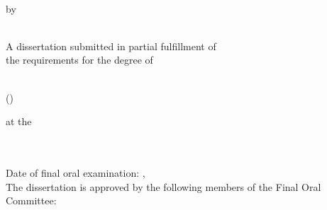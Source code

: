 



\thispagestyle{empty}

\vfill

\begin{center}
	\large
	\textcolor{Maroon}{\spacedallcaps{\myTitle}} \\
	\vspace{7ex}
	by \\
	\vspace{2ex}
	{\Large \spacedlowsmallcaps{\myName}} \\
	
	\vspace{9ex}
	
	A dissertation submitted in partial fulfillment of \\
	the requirements for the degree of \\
	
	\vspace{10ex}
	
	\myDegree \\
	\vspace{1ex}
	(\mySubject )\\
	
	\vspace{12ex}
	
	at the \\
	\vspace{1ex}
	\MakeTextUppercase{\myUniversity} \\
	\vspace{1ex}
	\myYear \\
\end{center}

\vspace{12ex}
\begin{flushleft}
Date of final oral examination: \myMonth \myDate , \myYear \\
\vspace{1ex}
The dissertation is approved by the following members of the Final Oral Committee:
\end{flushleft}

